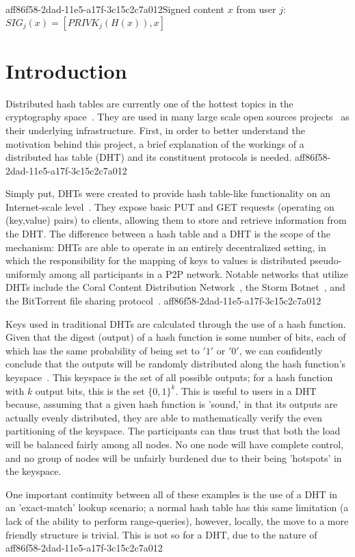 \documentclass[12pt]{article}
\begin{document}
aff86f58-2dad-11e5-a17f-3c15c2c7a012Signed content $x$ from user $j$: $SIG_j(x) = \left[ PRIVK_j( H(x) ), x \right]$

\section{Introduction}
\par Distributed hash tables are currently one of the hottest topics in the cryptography space~\cite{Stoica:2001dj,Rowstron:2001ea,Ratnasamy:2001wn}. They are used in many large scale open sources projects~\cite{Freitas:2013tb,Xu:2010vs,Perfitt:2010fh} as their underlying infrastructure. First, in order to better understand the motivation behind this project, a brief explanation of the workings of a distributed has table (DHT) and its constituent protocols is needed.
aff86f58-2dad-11e5-a17f-3c15c2c7a012
\par Simply put, DHTs were created to provide hash table-like functionality on an Internet-scale level~\cite{Ratnasamy:2001wn}. They expose basic PUT and GET requests (operating on (key,value) pairs) to clients, allowing them to store and retrieve information from the DHT. The difference between a hash table and a DHT is the scope of the mechanism: DHTs are able to operate in an entirely decentralized setting, in which the responsibility for the mapping of keys to values is distributed pseudo-uniformly among all participants in a P2P network. Notable networks that utilize DHTs include the Coral Content Distribution Network~\cite{Freedman:2004vb}, the Storm Botnet~\cite{Holz:2008uk}, and the BitTorrent file sharing protocol~\cite{Cohen:y1_8mBnw}.
aff86f58-2dad-11e5-a17f-3c15c2c7a012
\par Keys used in traditional DHTs are calculated through the use of a hash function. Given that the digest (output) of a hash function is some number of bits, each of which has the same probability of being set to $'1'$ or $'0'$, we can confidently conclude that the outputs will be randomly distributed along the hash function's keyspace~. This keyspace is the set of all possible outputs; for a hash function with $k$ output bits, this is the set $\{0,1\}^k$. This is useful to users in a DHT because, assuming that a given hash function is 'sound,' in that its outputs are actually evenly distributed, they are able to mathematically verify the even partitioning of the keyspace. The participants can thus trust that both the load will be balanced fairly among all nodes. No one node will have complete control, and no group of nodes will be unfairly burdened due to their being 'hotspots' in the keyspace.~

\par One important continuity between all of these examples is the use of a DHT in an 'exact-match' lookup scenario; a normal hash table has this same limitation (a lack of the ability to perform range-queries), however, locally, the move to a more friendly structure is trivial. This is not so for a DHT, due to the nature of
\printbibliography
aff86f58-2dad-11e5-a17f-3c15c2c7a012
\end{document}
